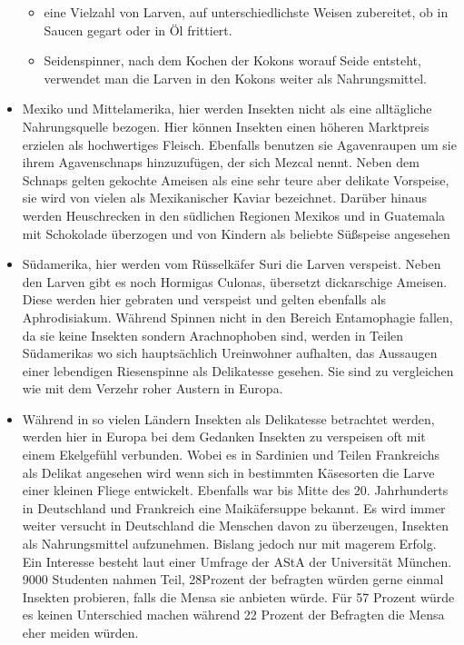 \begin{itemize}
\begin{itemize}
	\item eine Vielzahl von Larven, auf unterschiedlichste Weisen zubereitet, ob in Saucen gegart oder in Öl frittiert. 
	\item Seidenspinner, nach dem Kochen der Kokons worauf Seide entsteht, verwendet man die Larven in den Kokons weiter als Nahrungsmittel.
\end{itemize}
\item Mexiko und Mittelamerika, hier werden Insekten nicht als eine alltägliche
Nahrungsquelle bezogen. Hier können Insekten einen höheren Marktpreis
erzielen als hochwertiges Fleisch. Ebenfalls benutzen sie Agavenraupen
um sie ihrem Agavenschnaps hinzuzufügen, der sich Mezcal nennt. Neben
dem Schnaps gelten gekochte Ameisen als eine sehr teure aber delikate
Vorspeise, sie wird von vielen als Mexikanischer Kaviar bezeichnet. Darüber
hinaus werden Heuschrecken in den südlichen Regionen Mexikos
und in Guatemala mit Schokolade überzogen und von Kindern als beliebte
Süßspeise angesehen
\item Südamerika, hier werden vom Rüsselkäfer Suri die Larven verspeist. Neben
den Larven gibt es noch Hormigas Culonas, übersetzt dickarschige
Ameisen. Diese werden hier gebraten und verspeist und gelten ebenfalls
als Aphrodisiakum. Während Spinnen nicht in den Bereich Entamophagie
fallen, da sie keine Insekten sondern Arachnophoben sind, werden in
Teilen Südamerikas wo sich hauptsächlich Ureinwohner aufhalten, das
Aussaugen einer lebendigen Riesenspinne als Delikatesse gesehen. Sie
sind zu vergleichen wie mit dem Verzehr roher Austern in Europa.

\item Während in so vielen Ländern Insekten als Delikatesse betrachtet werden,
werden hier in Europa bei dem Gedanken Insekten zu verspeisen
oft mit einem Ekelgefühl verbunden. Wobei es in Sardinien und Teilen
Frankreichs als Delikat angesehen wird wenn sich in bestimmten Käsesorten
die Larve einer kleinen Fliege entwickelt. Ebenfalls war bis Mitte
des 20. Jahrhunderts in Deutschland und Frankreich eine Maikäfersuppe
bekannt. Es wird immer weiter versucht in Deutschland die Menschen
davon zu überzeugen, Insekten als Nahrungsmittel aufzunehmen. Bislang
jedoch nur mit magerem Erfolg. Ein Interesse besteht laut einer Umfrage
der AStA der Universität München. 9000 Studenten nahmen Teil, 28Prozent der befragten würden gerne einmal Insekten probieren, falls die
Mensa sie anbieten würde. Für 57 Prozent würde es keinen Unterschied
machen während 22 Prozent der Befragten die Mensa eher meiden würden.
\end{itemize}

